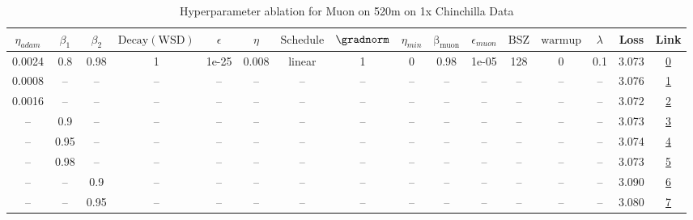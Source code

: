 \begin{table}[H]
\centering
\caption{Hyperparameter ablation for Muon on 520m on 1x Chinchilla Data}
\label{tab:ablation_muon_520m_on_1x_chinchilla_data}
\begin{tabular}{cccccccccccccccc}
\toprule
$\eta_{adam}$ & $\beta_1$ & $\beta_2$ & $\mathrm{Decay (WSD)}$ & $\epsilon$ & $\eta$ & $\mathrm{Schedule}$ & $\gradnorm$ & $\eta_{min}$ & $\mathrm{\beta_{muon}}$ & $\epsilon_{muon}$ & $\mathrm{BSZ}$ & $\mathrm{warmup}$ & $\lambda$ & Loss & Link \\
\midrule
0.0024 & 0.8 & 0.98 & 1 & 1e-25 & 0.008 & linear & 1 & 0 & 0.98 & 1e-05 & 128 & 0 & 0.1 & 3.073 & \href{https://wandb.ai/stanford-mercury/optimizer-scaling/runs/sweep-520m-10B-muonb6462flr0.008-wd0.1-minlr0-warmup0-b10.8-b20.-bb54fc}{0} \\
\midrule
0.0008 & -- & -- & -- & -- & -- & -- & -- & -- & -- & -- & -- & -- & -- & 3.076 & \href{https://wandb.ai/stanford-mercury/optimizer-scaling/runs/sweep-520m-10B-muoned1be6lr0.008-wd0.1-minlr0-warmup0-b10.8-b20.-472a68}{1} \\
0.0016 & -- & -- & -- & -- & -- & -- & -- & -- & -- & -- & -- & -- & -- & 3.072 & \href{https://wandb.ai/stanford-mercury/optimizer-scaling/runs/sweep-520m-10B-muoncab636lr0.008-wd0.1-minlr0-warmup0-b10.8-b20.-df4920}{2} \\
-- & 0.9 & -- & -- & -- & -- & -- & -- & -- & -- & -- & -- & -- & -- & 3.073 & \href{https://wandb.ai/stanford-mercury/optimizer-scaling/runs/sweep-520m-10B-muon3aa627lr0.008-wd0.1-minlr0-warmup0-b10.9-b20.-d88a74}{3} \\
-- & 0.95 & -- & -- & -- & -- & -- & -- & -- & -- & -- & -- & -- & -- & 3.074 & \href{https://wandb.ai/stanford-mercury/optimizer-scaling/runs/sweep-520m-10B-muon6de49alr0.008-wd0.1-minlr0-warmup0-b10.95-b20-09ab54}{4} \\
-- & 0.98 & -- & -- & -- & -- & -- & -- & -- & -- & -- & -- & -- & -- & 3.073 & \href{https://wandb.ai/stanford-mercury/optimizer-scaling/runs/sweep-520m-10B-muon73c7eelr0.008-wd0.1-minlr0-warmup0-b10.98-b20-25814b}{5} \\
-- & -- & 0.9 & -- & -- & -- & -- & -- & -- & -- & -- & -- & -- & -- & 3.090 & \href{https://wandb.ai/stanford-mercury/optimizer-scaling/runs/sweep-520m-10B-muon076a83lr0.008-wd0.1-minlr0-warmup0-b10.8-b20.-d5cd2a}{6} \\
-- & -- & 0.95 & -- & -- & -- & -- & -- & -- & -- & -- & -- & -- & -- & 3.080 & \href{https://wandb.ai/stanford-mercury/optimizer-scaling/runs/sweep-520m-10B-muon43dc84lr0.008-wd0.1-minlr0-warmup0-b10.8-b20.-b11016}{7} \\

\end{tabular}
\end{table}
